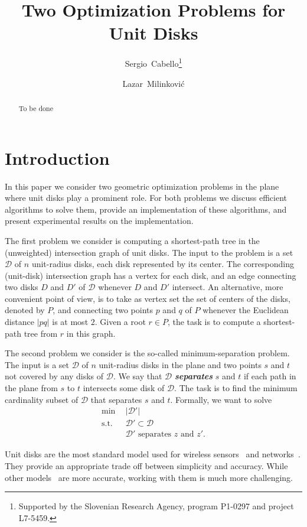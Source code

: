 \documentclass[a4paper,USenglish,numberwithinsect]{lipics}
\title{Two Optimization Problems for Unit Disks}
\author[1]{Sergio~Cabello\footnote{Supported by the Slovenian Research Agency, program P1-0297 and project L7-5459.}}
\author[2]{Lazar~Milinkovi\'c}
\affil[1]{FMF, University of Ljubljana, and 
	Institute of Mathematics, Physics and Mechanics, Slovenia}
\affil[2]{FMF and FRI, University of Ljubljana, Slovenia}
\newcommand{\D}{\ensuremath{\mathcal{D}}}
\def\DEF#1{\textbf{\emph{#1}}}
\begin{document}
\maketitle

\begin{abstract}
	To be done
\end{abstract}

\section{Introduction}

In this paper we consider two geometric optimization problems in the plane
where unit disks play a prominent role. For both problems 
we discuss efficient algorithms to solve them, provide an implementation
of these algorithms, and present experimental results on the implementation.

The first problem we consider is computing a shortest-path tree 
in the (unweighted) intersection graph of unit disks. 
The input to the problem is a set $\D$ of $n$ unit-radius disks, each disk
represented by its center.
The corresponding (unit-disk) intersection graph has a vertex for each disk,
and an edge connecting two disks $D$ and $D'$ of $\D$ whenever $D$ and $D'$ intersect.
An alternative, more convenient point of view, is to take as vertex set the set of
centers of the disks, denoted by $P$, and connecting two points $p$ and $q$ of $P$ 
whenever the Euclidean distance $|pq|$ is at most $2$. 
Given a root $r\in P$, the task is to compute a shortest-path tree from $r$ in this graph.

The second problem we consider is the so-called minimum-separation problem.
The input is a set $\D$ of $n$ unit-radius disks in the plane and two points
$s$ and $t$ not covered by any disks of $\D$.
We say that $\D$ \DEF{separates} $s$ and $t$ if each path in the plane 
from $s$ to $t$ intersects some disk of $\D$.
The task is to find the minimum cardinality subset of $\D$
that separates $s$ and $t$. Formally, we want to solve
\begin{align*}
	\min ~~		& |\D'|\\
	 \mbox{s.t.}~~ & \D'\subset \D\\
				&	\D'\text{ separates $z$ and $z'$}. 
\end{align*}

Unit disks are the most standard model used for wireless sensors~\cite{} 
and networks~\cite{}. 
They provide an appropriate trade off between simplicity and accuracy. 
While other models~\cite{} are more accurate, working with them is much more challenging.
\end{document}
